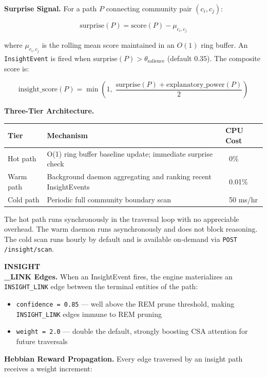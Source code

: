 \documentclass[10pt,journal,compsoc]{IEEEtran}
\begin{document}
\textbf{Surprise Signal.} For a path $P$ connecting community pair $(c_i, c_j)$:

\begin{equation}
\text{surprise}(P) = \text{score}(P) - \mu_{c_i, c_j}
\end{equation}

where $\mu_{c_i, c_j}$ is the rolling mean score maintained in an $O(1)$ ring buffer. An \texttt{InsightEvent} is fired when $\text{surprise}(P) > \theta_{\text{salience}}$ (default $0.35$). The composite score is:

\begin{equation}
\text{insight\_score}(P) = \min\!\left(1,\; \frac{\text{surprise}(P) + \text{explanatory\_power}(P)}{2}\right)
\end{equation}

\textbf{Three-Tier Archit\-ecture.}

\begin{center}
{\footnotesize
\begin{tabularx}{\columnwidth}{|>{\raggedright\arraybackslash}X|>{\raggedright\arraybackslash}X|>{\raggedright\arraybackslash}X|}
\hline
Tier & Mechanism & CPU Cost \\ \hline
Hot path & O(1) ring buffer baseline update; immediate surprise check & ~0\% \\ \hline
Warm path & Background daemon aggregating and ranking recent InsightEvents & ~0.01\% \\ \hline
Cold path & Periodic full community boundary scan & ~50 ms/hr \\ \hline
\end{tabularx}
}
\end{center}

The hot path runs synch\-ronously in the traversal loop with no appreciable overhead. The warm daemon runs async\-hronously and does not block reasoning. The cold scan runs hourly by default and is available on-demand via \texttt{POST /insight/scan}.

\textbf{INSIGHT\\_LINK Edges.} When an InsightEvent fires, the engine mater\-ializes an \texttt{INSIGHT\_LINK} edge between the terminal entities of the path:

\begin{itemize}
\item \texttt{confidence = 0.85} — well above the REM prune threshold, making \texttt{INSIGHT\_LINK} edges immune to REM pruning
\item \texttt{weight = 2.0} — double the default, strongly boosting CSA attention for future traversals

\end{itemize}
\textbf{Hebbian Reward Propagation.} Every edge traversed by an insight path receives a weight increment:
\end{document}
